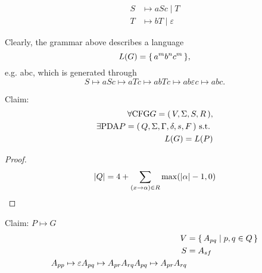 
\begin{align*}
    S &\mapsto aSc \mid T \\
    T &\mapsto bT  \mid \varepsilon
\end{align*}

Clearly, the grammar above describes a language
\[
    L(G) = { \left\{\, a^m b^n c^m \,\right\} },
\]
e.g. abc, which is generated through
\[
    S \mapsto aSc \mapsto aTc \mapsto abTc \mapsto ab\varepsilon c \mapsto abc.
\]

Claim:
\begin{align*}
    \forall \text{\upshape CFG} G = { \left(\,V,\Sigma,S,R\,\right) }, \\
    \exists \text{\upshape PDA} P = { \left(\,Q,\Sigma,\Gamma,\delta,s,F\,\right) } \text{ s.t.\ }  \\
    L(G) = L(P)
\end{align*}

\begin{proof}
    \[
        { \left\lvert Q \right\rvert } = 4 + \sum_{(x \to \alpha) \in R} \max( { \left\lvert \alpha \right\rvert } -1, 0 )
    \]
\end{proof}

Claim: $P \mapsto G$
\begin{align*}
    V &= { \left\{\, A_{pq} \mid p, q \in Q \,\right\} }  \\
    S &= A_{sf}  \\
    A_{pp} \mapsto \varepsilon
    A_{pq} \mapsto A_{pr} A_{rq}
    A_{pq} \mapsto A_{pr} A_{rq}
\end{align*}

